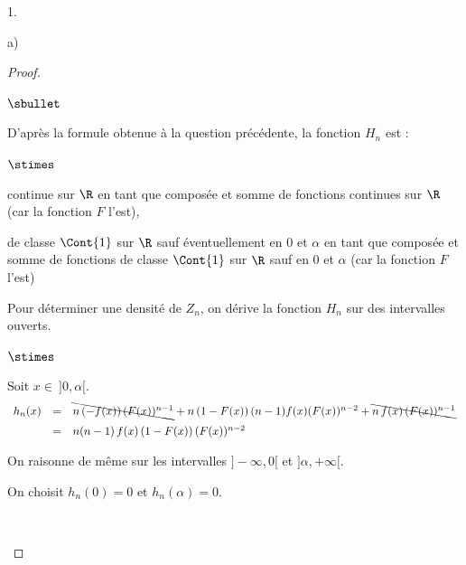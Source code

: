 \documentclass[11pt]{article}%
\begin{document}
\begin{noliste}{1.}
\begin{noliste}{a)}
    \begin{proof}~
      \begin{noliste}{$\sbullet$}
	\item D'après la formule obtenue à la question précédente, 
	la fonction $H_n$ est :
	\begin{noliste}{$\stimes$}
	  \item continue sur $\R$ en tant que composée et somme de 
	  fonctions continues sur $\R$ (car la fonction $F$ l'est),
	  
	  \item de classe $\Cont{1}$ sur $\R$ sauf éventuellement 
	  en $0$ et $\alpha$ en tant que composée et somme de 
	  fonctions de classe $\Cont{1}$ sur $\R$ sauf 
	  en $0$ et $\alpha$ (car la fonction $F$ l'est)
	\end{noliste}
	
	
	\newpage
	
	
	\item Pour déterminer une densité de $Z_n$, on dérive la 
	fonction $H_n$ sur des intervalles ouverts.
	\begin{noliste}{$\stimes$}
	  \item Soit $x\in \ ]0, \alpha[$.
	  \[
	    \begin{array}{rcl}
	      h_n(x) & = & \bcancel{n \, (-f(x)) \, (F(x))^{n-1}} + n \, 
	      (1-F(x)) \, (n-1)f(x)(F(x))^{n-2} + 
	      \bcancel{n \, f(x) \, (F(x))^{n-1}}
	      \\[.2cm]
	      & = & n(n-1) \, f(x) \, (1-F(x)) \, (F(x))^{n-2}
	    \end{array}
	  \]
	  
	  \item On raisonne de même sur les intervalles $]-\infty, 0[$ 
	  et $]\alpha, +\infty[$.
	  
	  \item On choisit $h_n(0)=0$ et $h_n(\alpha)=0$.
	\end{noliste}
	~\\[-1.4cm]
      \end{noliste}
    \end{proof}
  \end{noliste}
  

\end{noliste}
\end{document}
